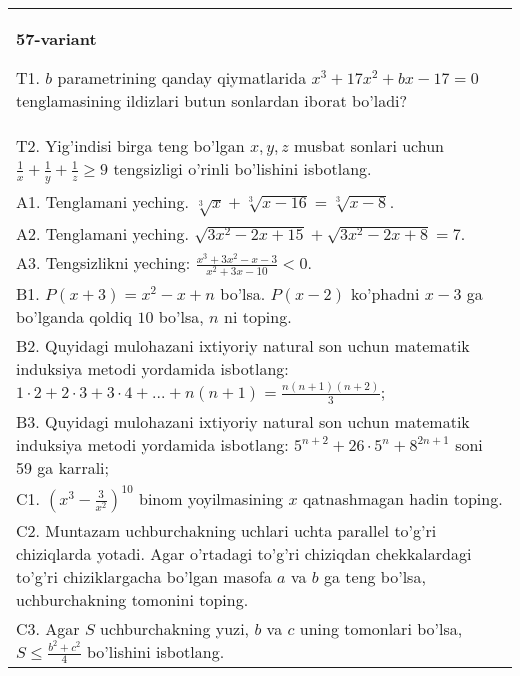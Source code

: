 \documentclass{article}
\begin{document}
\begin{tabular}{m{17cm}}
\textbf{57-variant}
\newline

T1. \(b\) parametrining qanday qiymatlarida \(x^{3} + 17x^{2} + bx - 17 = 0\) tenglamasining ildizlari butun sonlardan iborat bo'ladi? \\
T2. Yig'indisi birga teng bo'lgan \(x,y,z\) musbat sonlari uchun \(\frac{1}{x} + \frac{1}{y} + \frac{1}{z} \geq 9\) tengsizligi o'rinli bo'lishini isbotlang. \\
A1. Tenglamani yeching. \(\sqrt[3]{x} + \sqrt[3]{x - 16} = \sqrt[3]{x - 8}\). \\
A2. Tenglamani yeching. \(\sqrt{3x^{2} - 2x + 15} + \sqrt{3x^{2} - 2x + 8} = 7\). \\
A3. Tengsizlikni yeching: \(\frac{x^{3} + 3x^{2} - x - 3}{x^{2} + 3x - 10} < 0\). \\
B1. \(P(x + 3) = x^{2} - x + n\) bo'lsa. \(P(x - 2)\) ko'phadni \(x - 3\) ga bo'lganda qoldiq \(10\) bo'lsa, \(n\) ni toping. \\
B2. Quyidagi mulohazani ixtiyoriy natural son uchun matematik induksiya metodi yordamida isbotlang: \(1 \cdot 2 + 2 \cdot 3 + 3 \cdot 4 + ... + n(n + 1) = \frac{n(n + 1)(n + 2)}{3}\); \\
B3. Quyidagi mulohazani ixtiyoriy natural son uchun matematik induksiya metodi yordamida isbotlang: \(5^{n + 2} + 26 \cdot 5^{n} + 8^{2n + 1}\) soni 59 ga karrali; \\
C1. \(\left( x^{3} - \frac{3}{x^{2}} \right)^{10}\) binom yoyilmasining \(x\) qatnashmagan hadin toping. \\
C2. Muntazam uchburchakning uchlari uchta parallel to'g'ri chiziqlarda yotadi. Agar o'rtadagi to'g'ri chiziqdan chekkalardagi to'g'ri chiziklargacha bo'lgan masofa \(a\) va \(b\) ga teng bo'lsa, uchburchakning tomonini toping. \\
C3. Agar \(S\) uchburchakning yuzi, \(b\) va \(c\) uning tomonlari bo'lsa, \(S \leq \frac{b^{2} + c^{2}}{4}\) bo'lishini isbotlang. \\

\end{tabular}
\vspace{1cm}
\end{document}

